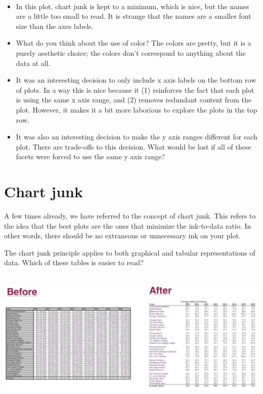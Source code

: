 \documentclass[]{book}
\begin{document}
~

\begin{itemize}
\item
  In this plot, chart junk is kept to a minimum, which is nice, but the names are a little too small to read. It is strange that the names are a smaller font size than the axes labels.
\item
  What do you think about the use of color? The colors are pretty, but it is a purely aesthetic choice; the colors don't correspond to anything about the data at all.
\item
  It was an interesting decision to only include x axis labels on the bottom row of plots. In a way this is nice because it (1) reinforces the fact that each plot is using the same x axis range, and (2) removes redundant content from the plot. However, it makes it a bit more laborious to explore the plots in the top row.
\item
  It was also an interesting decision to make the y axis ranges different for each plot. There are trade-offs to this decision. What would be lost if all of these facets were forced to use the same y axis range?
\end{itemize}

\hypertarget{chart-junk}{%
\section*{Chart junk}\label{chart-junk}}

A few times already, we have referred to the concept of chart junk. This refers to the idea that the best plots are the ones that minimize the ink-to-data ratio. In other words, there should be no extraneous or unnecessary ink on your plot.

The chart junk principle applies to both graphical and tabular representations of data. Which of these tables is easier to read?

~\\

\includegraphics{img/vis17.png}
\end{document}
